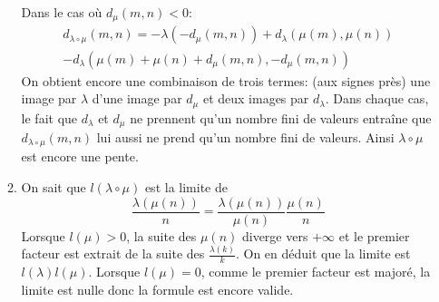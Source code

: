 \begin{enumerate}
\begin{enumerate}
Dans le cas où $d_\mu(m,n)< 0$:
\begin{multline*}
d_{\lambda\circ \mu}(m,n)  
= -\lambda\left( -d_\mu(m,n)\right)  + d_\lambda\left( \mu(m),\mu(n)\right)\\
- d_\lambda\left( \mu(m)+\mu(n)+d_\mu(m,n),-d_\mu(m,n)\right)
\end{multline*}
On obtient encore une combinaison de trois termes: (aux signes près) une image par $\lambda$ d'une image par $d_\mu$ et deux images par $d_\lambda$.
\newline
Dans chaque cas, le fait que $d_\lambda$ et $d_\mu$ ne prennent qu'un nombre fini de valeurs entraîne que $d_{\lambda\circ \mu}(m,n)$ lui aussi ne prend qu'un nombre fini de valeurs. Ainsi $\lambda \circ \mu$ est encore une pente.
 \item On sait que $l(\lambda \circ \mu)$ est la limite de 
\begin{displaymath}
  \frac{\lambda(\mu(n))}{n}=\frac{\lambda(\mu(n))}{\mu(n)}\frac{\mu(n)}{n}
\end{displaymath}
Lorsque $l(\mu)>0$, la suite des $\mu(n)$ diverge vers $+\infty$ et le premier facteur est extrait de la suite des $\frac{\lambda(k)}{k}$. On en déduit que la limite est $l(\lambda)l(\mu)$.\newline
Lorsque $l(\mu)=0$, comme le premier facteur est majoré, la limite est nulle donc la formule est encore valide.
\end{enumerate}
\end{enumerate}
